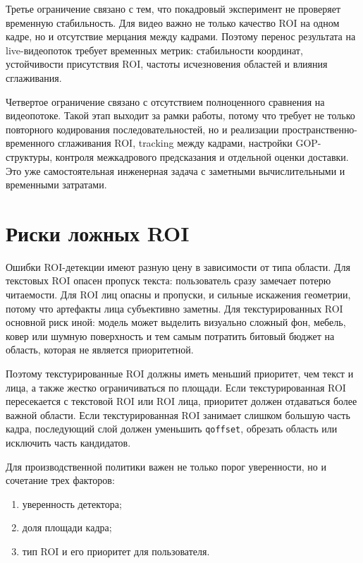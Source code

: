 \documentclass[12pt,a4paper,oneside,openany]{report}
\begin{document}
Третье ограничение связано с тем, что покадровый эксперимент не проверяет временную
стабильность. Для видео важно не только качество ROI на одном кадре, но и отсутствие мерцания
между кадрами. Поэтому перенос результата на live-видеопоток требует временных метрик:
стабильности координат, устойчивости присутствия ROI, частоты исчезновения областей и влияния
сглаживания.

Четвертое ограничение связано с отсутствием полноценного сравнения на видеопотоке. Такой этап
выходит за рамки работы, потому что требует не только повторного кодирования последовательностей,
но и реализации пространственно-временного сглаживания ROI, tracking между кадрами, настройки
GOP-структуры, контроля межкадрового предсказания и отдельной оценки доставки. Это уже
самостоятельная инженерная задача с заметными вычислительными и временными затратами.


\section{Риски ложных ROI}

Ошибки ROI-детекции имеют разную цену в зависимости от типа области. Для текстовых ROI опасен
пропуск текста: пользователь сразу замечает потерю читаемости. Для ROI лиц опасны и пропуски, и
сильные искажения геометрии, потому что артефакты лица субъективно заметны. Для текстурированных
ROI основной риск иной: модель может выделить визуально сложный фон, мебель, ковер или шумную
поверхность и тем самым потратить битовый бюджет на область, которая не является приоритетной.

Поэтому текстурированные ROI должны иметь меньший приоритет, чем текст и лица, а также жестко
ограничиваться по площади. Если текстурированная ROI пересекается с текстовой ROI или ROI лица,
приоритет должен отдаваться более важной области. Если текстурированная ROI занимает слишком
большую часть кадра, последующий слой должен уменьшить \texttt{qoffset}, обрезать область или
исключить часть кандидатов.

Для производственной политики важен не только порог уверенности, но и сочетание трех факторов:
\begin{enumerate}[label=\arabic*)]
  \item уверенность детектора;
  \item доля площади кадра;
  \item тип ROI и его приоритет для пользователя.
\end{enumerate}
\end{document}
